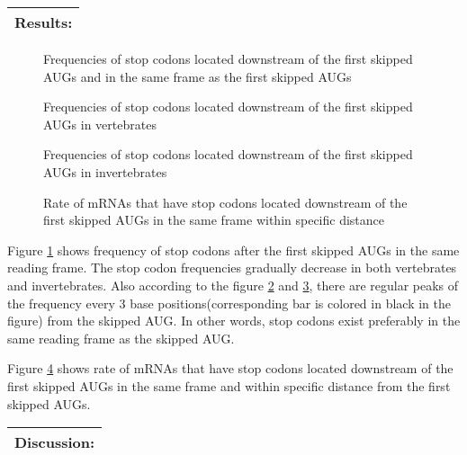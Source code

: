 \vspace{2ex}
\noindent
\begin{tabular}{|l|}
\hline
Results:\\
\hline
\end{tabular}

\begin{figure}
\begin{center}
\end{center}
\caption{Frequencies of stop codons located downstream of the first
skipped AUGs and in the same frame as the first skipped AUGs}
\label{eu_stopf}
\end{figure}


\begin{figure}
\caption{Frequencies of stop codons located downstream of the first
skipped AUGs in vertebrates}
\label{gbstop}
\end{figure}

\begin{figure}
\caption{Frequencies of stop codons located downstream of the first
skipped AUGs in invertebrates}
\label{invstop}
\end{figure}

\begin{figure}
\begin{center}
\end{center}
\caption{Rate of mRNAs that have stop codons located downstream of
the first skipped AUGs in the same frame within specific distance}
\label{stop_reini}
\end{figure}

Figure \ref{eu_stopf} shows frequency of stop 
codons after the first skipped
AUGs in the same reading frame.  The
stop codon frequencies gradually decrease in
both vertebrates and invertebrates.  Also according to the figure
\ref{gbstop} and \ref{invstop}, there are regular peaks of
the frequency every 3 base positions(corresponding bar is colored in
 black in the figure)
 from the skipped AUG.  In
other words, stop codons exist preferably in the same reading frame
as the skipped AUG. 

Figure \ref{stop_reini} shows rate of mRNAs that have stop codons
located downstream of the first skipped AUGs in the same frame and within
specific distance from the first skipped AUGs. 



\vspace{2ex}
\noindent
\begin{tabular}{|l|}
\hline
Discussion:\\
\hline
\end{tabular}

